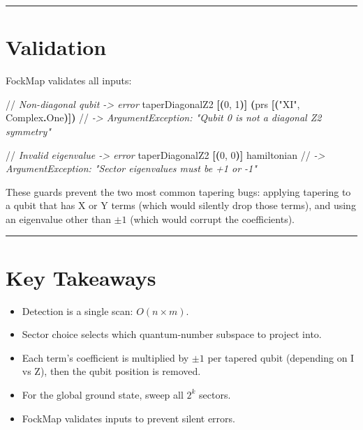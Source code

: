 \documentclass[
  11pt,
  oneside]{book}
\newenvironment{Shaded}{\begin{snugshade}}{\end{snugshade}}
\newcommand{\CommentTok}[1]{\textcolor[rgb]{0.56,0.35,0.01}{\textit{#1}}}
\newcommand{\DecValTok}[1]{\textcolor[rgb]{0.00,0.00,0.81}{#1}}
\newcommand{\KeywordTok}[1]{\textcolor[rgb]{0.13,0.29,0.53}{\textbf{#1}}}
\newcommand{\NormalTok}[1]{#1}
\newcommand{\OperatorTok}[1]{\textcolor[rgb]{0.81,0.36,0.00}{\textbf{#1}}}
\newcommand{\StringTok}[1]{\textcolor[rgb]{0.31,0.60,0.02}{#1}}
\providecommand{\tightlist}{%
  \setlength{\itemsep}{0pt}\setlength{\parskip}{0pt}}
\begin{document}
\begin{center}\rule{0.5\linewidth}{0.5pt}\end{center}

\section{Validation}\label{validation}

FockMap validates all inputs:

\begin{Shaded}
\begin{Highlighting}[]
\NormalTok{//}\CommentTok{ Non{-}diagonal qubit -> error}
\NormalTok{taperDiagonalZ2 }\OperatorTok{[(}\DecValTok{0}\NormalTok{, }\DecValTok{1}\OperatorTok{)]} \OperatorTok{(}\NormalTok{prs }\OperatorTok{[(}\StringTok{"XI"}\NormalTok{, Complex}\KeywordTok{.}\NormalTok{One}\OperatorTok{)])}
\NormalTok{//}\CommentTok{ -> ArgumentException: "Qubit 0 is not a diagonal Z2 symmetry"}

\NormalTok{//}\CommentTok{ Invalid eigenvalue -> error}
\NormalTok{taperDiagonalZ2 }\OperatorTok{[(}\DecValTok{0}\NormalTok{, }\DecValTok{0}\OperatorTok{)]}\NormalTok{ hamiltonian}
\NormalTok{//}\CommentTok{ -> ArgumentException: "Sector eigenvalues must be +1 or {-}1"}
\end{Highlighting}
\end{Shaded}

These guards prevent the two most common tapering bugs: applying
tapering to a qubit that has X or Y terms (which would silently drop
those terms), and using an eigenvalue other than \(\pm 1\) (which would
corrupt the coefficients).

\begin{center}\rule{0.5\linewidth}{0.5pt}\end{center}

\section{Key Takeaways}\label{key-takeaways-10}

\begin{itemize}
\tightlist
\item
  Detection is a single scan: \(O(n \times m)\).
\item
  Sector choice selects which quantum-number subspace to project into.
\item
  Each term's coefficient is multiplied by \(\pm 1\) per tapered qubit
  (depending on I vs Z), then the qubit position is removed.
\item
  For the global ground state, sweep all \(2^k\) sectors.
\item
  FockMap validates inputs to prevent silent errors.
\end{itemize}
\end{document}
